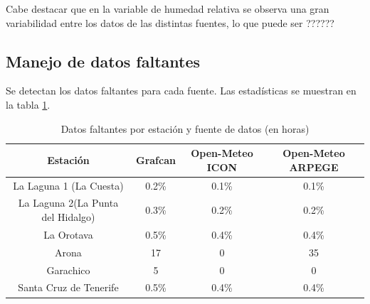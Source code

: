 Cabe destacar que en la variable de humedad relativa se observa una gran variabilidad entre los datos de las distintas fuentes, lo que puede ser ??????

\subsection{Manejo de datos faltantes}
Se detectan los datos faltantes para cada fuente. Las estadísticas se muestran en la tabla \ref{tabla_datos_faltantes}.
\begin{table}[htb]
    \centering
    \begin{tabular}{|c|c|c|c|}
        \hline
        Estación & Grafcan & Open-Meteo ICON & Open-Meteo ARPEGE \\
        \hline
        La Laguna 1 (La Cuesta) & 0.2\% & 0.1\% & 0.1\% \\
        La Laguna 2(La Punta del Hidalgo) & 0.3\% & 0.2\% & 0.2\% \\
        La Orotava & 0.5\% & 0.4\% & 0.4\% \\
        Arona & 17 & 0 & 35 \\
        Garachico & 5 & 0 & 0 \\
        Santa Cruz de Tenerife & 0.5\% & 0.4\% & 0.4\% \\
        \hline
    \end{tabular}
    \caption{Datos faltantes por estación y fuente de datos (en horas)}
    \label{tabla_datos_faltantes} 
\end{table}

